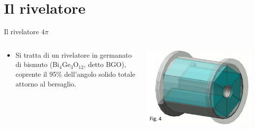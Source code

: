 \documentclass [xcolor=svgnames] {beamer}
\begin{document}
	\section{Il rivelatore}
	\begin{frame}{Il rivelatore $4\pi$}
		\begin{columns}
			\begin{column}{0.45\textwidth}
				\begin{itemize}
					\item Si tratta di un rivelatore in germanato di bismuto (Bi$_{4}$Ge$_{3}$O$_{12}$, detto BGO), coprente il 95\% dell'angolo solido totale attorno al bersaglio.
				\end{itemize}
			\end{column}
			\begin{column}{0.45\textwidth}
				\centering
				\includegraphics[width=\textwidth]{img/bgo_3d.png}
			\end{column}
		\end{columns}
		
	\end{frame}
\end{document}

